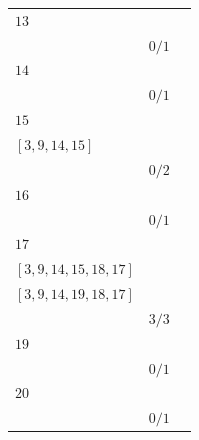 \documentclass[12pt, a4paper]{extarticle}
\begin{document}
\begin{table}[h!]
\begin{tabularx}{\textwidth}{|X|X|X|}
        \hline
        $13$ & \begin{tabular}{@{}l@{}} $[3, 9, 13]$ \\ \end{tabular} & $0/1$ \\
        \hline
        $14$ & \begin{tabular}{@{}l@{}} $[3, 9, 14]$ \\ \end{tabular} & $0/1$ \\
        \hline
        $15$ & \begin{tabular}{@{}l@{}} $[3, 9, 13, 15]$ \\  $[3, 9, 14, 15]$ \\ \end{tabular} & $0/2$ \\
        \hline
        $16$ & \begin{tabular}{@{}l@{}} $[3, 6, 10, 16]$ \\ \end{tabular} & $0/1$ \\
        \hline
        $17$ & \begin{tabular}{@{}l@{}} $[3, 9, 13, 15, 18, 17]$ \\  $[3, 9, 14, 15, 18, 17]$ \\  $[3, 9, 14, 19, 18, 17]$ \\ \end{tabular} & $3/3$ \\
        \hline
        $19$ & \begin{tabular}{@{}l@{}} $[3, 9, 14, 19]$ \\ \end{tabular} & $0/1$ \\
        \hline
        $20$ & \begin{tabular}{@{}l@{}} $[3, 9, 14, 19, 20]$ \\ \end{tabular} & $0/1$ \\
        \hline
    \end{tabularx}
\end{table}
\end{document}
